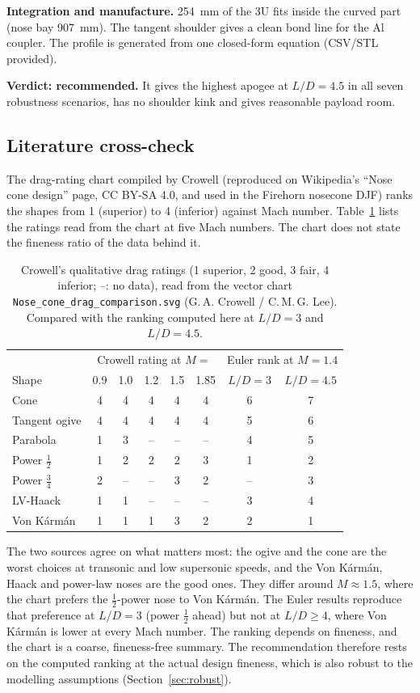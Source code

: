 \textbf{Integration and manufacture.} \SI{254}{mm} of the 3U fits inside the curved part (nose bay
\SI{907}{mm}). The tangent shoulder gives a clean bond line for the Al coupler. The profile is
generated from one closed-form equation (CSV/STL provided).

\textbf{Verdict: recommended.} It gives the highest apogee at $L/D = 4.5$ in all seven robustness
scenarios, has no shoulder kink and gives reasonable payload room.

\subsection{Literature cross-check}
\label{sec:crowell}

The drag-rating chart compiled by Crowell (reproduced on Wikipedia's ``Nose cone design'' page,
CC BY-SA 4.0, and used in the Firehorn nosecone DJF) ranks the shapes from 1 (superior) to 4
(inferior) against Mach number. Table~\ref{tab:crowell} lists the ratings read from the chart at
five Mach numbers. The chart does not state the fineness ratio of the data behind it.

\begin{table}[H]
\centering
\caption{Crowell's qualitative drag ratings (1 superior, 2 good, 3 fair, 4 inferior; --: no data),
read from the vector chart \texttt{Nose\_cone\_drag\_comparison.svg} (G.\,A. Crowell / C.\,M.\,G.
Lee). Compared with the ranking computed here at $L/D=3$ and $L/D=4.5$.}
\label{tab:crowell}
\small
\begin{tabular}{@{}lccccc|cc@{}}
\toprule
 & \multicolumn{5}{c|}{Crowell rating at $M =$} & \multicolumn{2}{c}{Euler rank at $M=1.4$} \\
Shape & 0.9 & 1.0 & 1.2 & 1.5 & 1.85 & $L/D=3$ & $L/D=4.5$ \\
\midrule
Cone & 4 & 4 & 4 & 4 & 4 & 6 & 7 \\
Tangent ogive & 4 & 4 & 4 & 4 & 4 & 5 & 6 \\
Parabola & 1 & 3 & -- & -- & -- & 4 & 5 \\
Power $\tfrac12$ & 1 & 2 & 2 & 2 & 3 & 1 & 2 \\
Power $\tfrac34$ & 2 & -- & -- & 3 & 2 & -- & 3 \\
LV-Haack & 1 & 1 & -- & -- & -- & 3 & 4 \\
Von K\'arm\'an & 1 & 1 & 1 & 3 & 2 & 2 & 1 \\
\bottomrule
\end{tabular}
\end{table}

The two sources agree on what matters most: the ogive and the cone are the worst choices at
transonic and low supersonic speeds, and the Von K\'arm\'an, Haack and power-law noses are the
good ones. They differ around $M \approx 1.5$, where the chart prefers the $\tfrac12$-power nose
to Von K\'arm\'an. The Euler results reproduce that preference at $L/D = 3$ (power $\tfrac12$
ahead) but not at $L/D \geq 4$, where Von K\'arm\'an is lower at every Mach number. The
ranking depends on fineness, and the chart is a coarse, fineness-free summary. The
recommendation therefore rests on the computed ranking at the actual design fineness, which is
also robust to the modelling assumptions (Section~\ref{sec:robust}).

